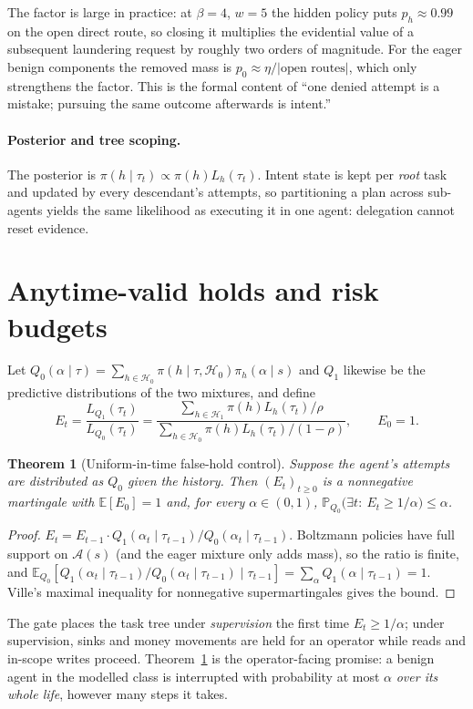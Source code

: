 \documentclass[11pt]{article}
\newtheorem{theorem}{Theorem}
\theoremstyle{definition}
\theoremstyle{remark}
\newcommand{\A}{\mathcal{A}}
\newcommand{\act}{\alpha}
\newcommand{\traj}{\tau}
\newcommand{\Hb}{\mathcal{H}_0}
\newcommand{\Ha}{\mathcal{H}_1}
\newcommand{\Qb}{Q_0}
\newcommand{\Qa}{Q_1}
\newcommand{\E}{\mathbb{E}}
\renewcommand{\Pr}{\mathbb{P}}
\begin{document}
The factor is large in practice: at $\beta=4$, $w=5$ the hidden policy puts $p_h\approx0.99$ on the open direct route, so closing it multiplies the evidential value of a subsequent laundering request by roughly two orders of magnitude. For the eager benign components the removed mass is $p_0\approx\eta/|\text{open routes}|$, which only strengthens the factor. This is the formal content of ``one denied attempt is a mistake; pursuing the same outcome afterwards is intent.''

\paragraph{Posterior and tree scoping.} The posterior is $\pi(h\mid\traj_t)\propto\pi(h)L_h(\traj_t)$. Intent state is kept per \emph{root} task and updated by every descendant's attempts, so partitioning a plan across sub-agents yields the same likelihood as executing it in one agent: delegation cannot reset evidence.

\section{Anytime-valid holds and risk budgets}
\label{sec:evalid}

Let $\Qb(\act\mid\traj)=\sum_{h\in\Hb}\pi(h\mid\traj,\Hb)\pi_h(\act\mid s)$ and $\Qa$ likewise be the predictive distributions of the two mixtures, and define
\[
E_t=\frac{L_{\Qa}(\traj_t)}{L_{\Qb}(\traj_t)}=\frac{\sum_{h\in\Ha}\pi(h)L_h(\traj_t)/\rho}{\sum_{h\in\Hb}\pi(h)L_h(\traj_t)/(1-\rho)},\qquad E_0=1 .
\]

\begin{theorem}[Uniform-in-time false-hold control]
\label{thm:ville}
Suppose the agent's attempts are distributed as $\Qb$ given the history. Then $(E_t)_{t\ge0}$ is a nonnegative martingale with $\E[E_0]=1$ and, for every $\alpha\in(0,1)$, $\Pr_{\Qb}\big(\exists t:\ E_t\ge 1/\alpha\big)\le\alpha$.
\end{theorem}
\begin{proof}
$E_t=E_{t-1}\cdot\Qa(\act_t\mid\traj_{t-1})/\Qb(\act_t\mid\traj_{t-1})$. Boltzmann policies have full support on $\A(s)$ (and the eager mixture only adds mass), so the ratio is finite, and $\E_{\Qb}[\Qa(\act_t\mid\traj_{t-1})/\Qb(\act_t\mid\traj_{t-1})\mid\traj_{t-1}]=\sum_{\act}\Qa(\act\mid\traj_{t-1})=1$. Ville's maximal inequality for nonnegative supermartingales gives the bound.
\end{proof}

The gate places the task tree under \emph{supervision} the first time $E_t\ge1/\alpha$; under supervision, sinks and money movements are held for an operator while reads and in-scope writes proceed. Theorem~\ref{thm:ville} is the operator-facing promise: a benign agent in the modelled class is interrupted with probability at most $\alpha$ \emph{over its whole life}, however many steps it takes.
\end{document}
